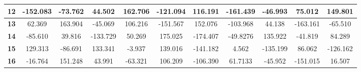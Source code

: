 \documentclass[conference]{IEEEtran}
\begin{document}
\begin{table*}[!ht]
\begin{center}
{\begin{tabular}{|l|l|l|l|l|l|l|l|l|l|l|}
\hline
\multicolumn{1}{|c|}{\textbf{12}} & \multicolumn{1}{c|}{-152.083} & \multicolumn{1}{c|}{-73.762} & \multicolumn{1}{c|}{44.502} & \multicolumn{1}{c|}{162.706} & \multicolumn{1}{c|}{-121.094} & \multicolumn{1}{c|}{116.191} & \multicolumn{1}{c|}{-161.439} & \multicolumn{1}{c|}{-46.993} & \multicolumn{1}{c|}{75.012} & \multicolumn{1}{c|}{149.801} \\ 
\hline
\multicolumn{1}{|c|}{\textbf{13}} & \multicolumn{1}{c|}{62.369} & \multicolumn{1}{c|}{163.904} & \multicolumn{1}{c|}{-45.069} & \multicolumn{1}{c|}{106.216} & \multicolumn{1}{c|}{-151.567} & \multicolumn{1}{c|}{152.076} & \multicolumn{1}{c|}{-103.968} & \multicolumn{1}{c|}{44.138} & \multicolumn{1}{c|}{-163.161} & \multicolumn{1}{c|}{-65.510} \\ 
\hline
\multicolumn{1}{|c|}{\textbf{14}} & \multicolumn{1}{c|}{-85.610} & \multicolumn{1}{c|}{39.816} & \multicolumn{1}{c|}{-133.729} & \multicolumn{1}{c|}{50.269} & \multicolumn{1}{c|}{175.025} & \multicolumn{1}{c|}{-174.407} & \multicolumn{1}{c|}{-49.8276} & \multicolumn{1}{c|}{135.922} & \multicolumn{1}{c|}{-41.819} & \multicolumn{1}{c|}{84.289} \\ 
\hline
\multicolumn{1}{|c|}{\textbf{15}} & \multicolumn{1}{c|}{129.313} & \multicolumn{1}{c|}{-86.691} & \multicolumn{1}{c|}{133.341} & \multicolumn{1}{c|}{-3.937} & \multicolumn{1}{c|}{139.016} & \multicolumn{1}{c|}{-141.182} & \multicolumn{1}{c|}{4.562} & \multicolumn{1}{c|}{-135.199} & \multicolumn{1}{c|}{86.062} & \multicolumn{1}{c|}{-126.162} \\ 
\hline
\multicolumn{1}{|c|}{\textbf{16}} & \multicolumn{1}{c|}{-16.764} & \multicolumn{1}{c|}{151.248} & \multicolumn{1}{c|}{43.991} & \multicolumn{1}{c|}{-63.321} & \multicolumn{1}{c|}{106.209} & \multicolumn{1}{c|}{-106.390} & \multicolumn{1}{c|}{61.7133 } & \multicolumn{1}{c|}{-45.952} & \multicolumn{1}{c|}{-151.015} & \multicolumn{1}{c|}{16.507} \\ 
\hline
\end{tabular}

}
\label{tab3}
\end{center}
\end{table*}
\end{document}
